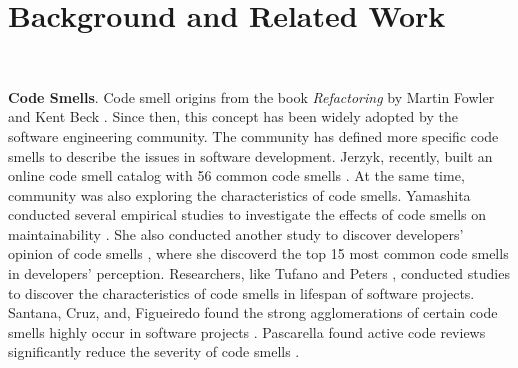 \section{Background and Related Work}~\label{sec:background}


{\bf Code Smells}. Code smell origins from the book \textit{Refactoring} by
Martin Fowler and Kent Beck \cite{Fowler_Beck}. Since then, this concept has
been widely adopted by the software engineering community. The community has
defined more specific code smells
\cite{Pysmell,SQLAntipatterns,CleanCode,RefactoringWorkbook} to describe the
issues in software development. Jerzyk, recently, built an online code smell
catalog with 56 common code smells \cite{Jerzyk2023}. At the same time,
community was also exploring the characteristics of code smells. Yamashita
conducted several empirical studies to investigate the effects of code smells on
maintainability \cite{6392174} \cite{6405287}. She also conducted another study
to discover developers' opinion of code smells \cite{developersCare}, where she
discoverd the top 15 most common code smells in developers' perception.
Researchers, like Tufano \cite{whenandwhy} and Peters \cite{lifespan}, conducted
studies to discover the characteristics of code smells in lifespan of software
projects. Santana, Cruz, and, Figueiredo found the strong agglomerations of
certain code smells highly occur in software projects \cite{Santana}. Pascarella
found active code reviews significantly reduce the severity of code smells
\cite{Pascarella}.


